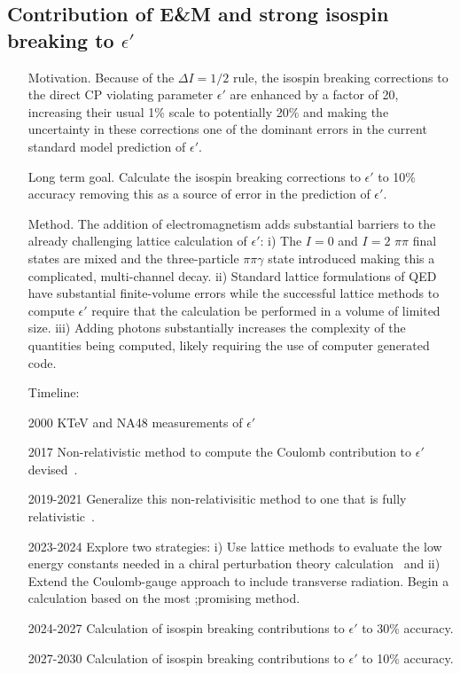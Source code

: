 \documentclass[prd,showpacs,showkeys,preprintnumbers,floatfix,
nofootinbib%
]{revtex4-2}
\begin{document}
\subsection{Contribution of E\&M and strong isospin breaking to $\epsilon'$}
\begin{itemize}
    \item[Motivation.] Because of the $\Delta I=1/2$ rule, the isospin breaking corrections to the direct CP violating parameter $\epsilon'$ are enhanced by a factor of 20, increasing their usual 1\% scale to potentially 20\% and making the uncertainty in these corrections one of the dominant errors in the current standard model prediction of $\epsilon'$.
    \item[Long term goal.] Calculate the isospin breaking corrections to $\epsilon'$ to 10\% accuracy removing this as a source of error in the prediction of $\epsilon'$.
    \item[Method.] The addition of electromagnetism adds substantial barriers to the already challenging lattice calculation of $\epsilon'$:  i) The $I=0$ and $I=2$ $\pi\pi$ final states are mixed and the three-particle $\pi\pi\gamma$ state introduced making this a complicated, multi-channel decay. ii)  Standard lattice formulations of QED have substantial finite-volume errors while the successful lattice methods to compute $\epsilon'$ require that the calculation be performed in a volume of limited size.  iii) Adding photons substantially increases the complexity of the quantities being computed, likely requiring the use of computer generated code.
\item[Timeline:]
    \item[2000] KTeV and NA48 measurements of $\epsilon'$
    \item[2017] Non-relativistic method to compute the Coulomb contribution to $\epsilon'$ devised~\cite{Christ:2017pze}.
    \item[2019-2021] Generalize this non-relativisitic method to one that is fully relativistic~\cite{Christ:2021guf}.
    \item[2023-2024] Explore two strategies:  i) Use lattice methods to evaluate the low energy constants needed in a chiral perturbation theory calculation~\cite{Cirigliano:2019cpi} and ii) Extend the Coulomb-gauge approach to include transverse radiation.  Begin a calculation based on the most ;promising method.
    \item[2024-2027] Calculation of isospin breaking contributions to $\epsilon'$ to 30\% accuracy.
    \item[2027-2030] Calculation of isospin breaking contributions to $\epsilon'$ to 10\% accuracy.
\end{itemize}
\end{document}
